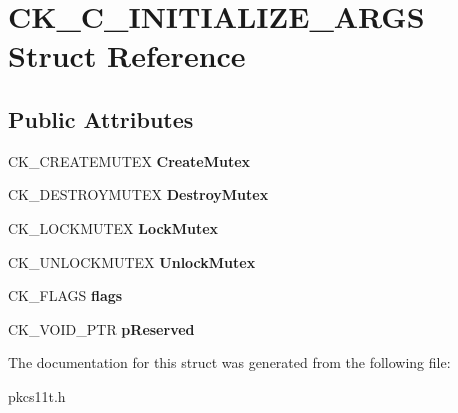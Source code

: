 \hypertarget{struct_c_k___c___i_n_i_t_i_a_l_i_z_e___a_r_g_s}{}\section{C\+K\+\_\+\+C\+\_\+\+I\+N\+I\+T\+I\+A\+L\+I\+Z\+E\+\_\+\+A\+R\+GS Struct Reference}
\label{struct_c_k___c___i_n_i_t_i_a_l_i_z_e___a_r_g_s}
\subsection*{Public Attributes}
\begin{DoxyCompactItemize}
\item 
\mbox{\label{struct_c_k___c___i_n_i_t_i_a_l_i_z_e___a_r_g_s_ae4a461121c37163cb153f17f1b4598de}} 
C\+K\+\_\+\+C\+R\+E\+A\+T\+E\+M\+U\+T\+EX {\bfseries Create\+Mutex}
\item 
\mbox{\label{struct_c_k___c___i_n_i_t_i_a_l_i_z_e___a_r_g_s_a9b5ebf676f4a6c9306b68567f89a4efd}} 
C\+K\+\_\+\+D\+E\+S\+T\+R\+O\+Y\+M\+U\+T\+EX {\bfseries Destroy\+Mutex}
\item 
\mbox{\label{struct_c_k___c___i_n_i_t_i_a_l_i_z_e___a_r_g_s_acb3c3965f4190053337b9195e88f0d0c}} 
C\+K\+\_\+\+L\+O\+C\+K\+M\+U\+T\+EX {\bfseries Lock\+Mutex}
\item 
\mbox{\label{struct_c_k___c___i_n_i_t_i_a_l_i_z_e___a_r_g_s_a39405e53ae004b728c1f17d462c1bea5}} 
C\+K\+\_\+\+U\+N\+L\+O\+C\+K\+M\+U\+T\+EX {\bfseries Unlock\+Mutex}
\item 
\mbox{\label{struct_c_k___c___i_n_i_t_i_a_l_i_z_e___a_r_g_s_a8fd53ac76a9bc361f4fb2127b74cfc16}} 
C\+K\+\_\+\+F\+L\+A\+GS {\bfseries flags}
\item 
\mbox{\label{struct_c_k___c___i_n_i_t_i_a_l_i_z_e___a_r_g_s_a7c88d9ed84cd898ea906f20d096689a8}} 
C\+K\+\_\+\+V\+O\+I\+D\+\_\+\+P\+TR {\bfseries p\+Reserved}
\end{DoxyCompactItemize}


The documentation for this struct was generated from the following file\+:\begin{DoxyCompactItemize}
\item 
pkcs11t.\+h\end{DoxyCompactItemize}
